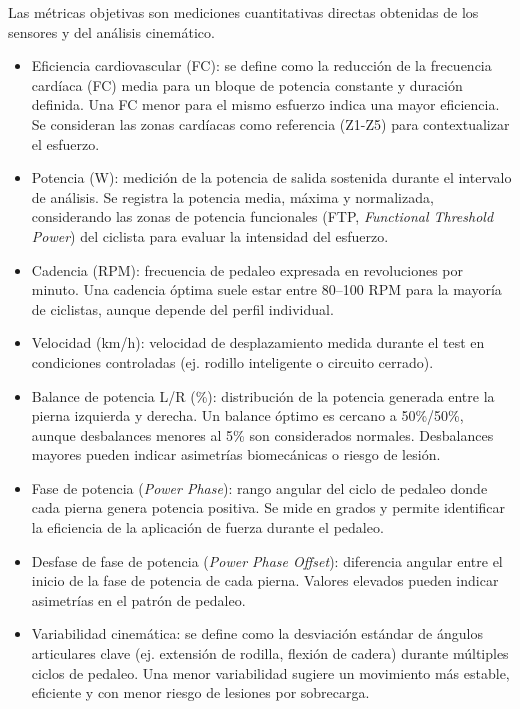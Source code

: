 Las métricas objetivas son mediciones cuantitativas directas obtenidas de los
sensores y del análisis cinemático.

\begin{itemize}
      \item Eficiencia cardiovascular (FC): se define como la reducción de la frecuencia
            cardíaca (FC) media para un bloque de potencia constante y duración definida.
            Una FC menor para el mismo esfuerzo indica una mayor eficiencia. Se consideran
            las zonas cardíacas como referencia (Z1-Z5) para contextualizar el esfuerzo.

      \item Potencia (W): medición de la potencia de salida sostenida durante el intervalo
            de análisis. Se registra la potencia media, máxima y normalizada, considerando
            las zonas de potencia funcionales (FTP, \textit{Functional Threshold Power})
            del ciclista para evaluar la intensidad del esfuerzo.

      \item Cadencia (RPM): frecuencia de pedaleo expresada en revoluciones por minuto. Una
            cadencia óptima suele estar entre 80--100 RPM para la mayoría de ciclistas,
            aunque depende del perfil individual.

      \item Velocidad (km/h): velocidad de desplazamiento medida durante el test en
            condiciones controladas (ej. rodillo inteligente o circuito cerrado).

      \item Balance de potencia L/R (\%): distribución de la potencia generada entre la
            pierna izquierda y derecha. Un balance óptimo es cercano a 50\%/50\%, aunque
            desbalances menores al 5\% son considerados normales. Desbalances mayores
            pueden indicar asimetrías biomecánicas o riesgo de lesión.

      \item Fase de potencia (\textit{Power Phase}): rango angular del ciclo de pedaleo
            donde cada pierna genera potencia positiva. Se mide en grados y permite
            identificar la eficiencia de la aplicación de fuerza durante el pedaleo.

      \item Desfase de fase de potencia (\textit{Power Phase Offset}): diferencia angular
            entre el inicio de la fase de potencia de cada pierna. Valores elevados pueden
            indicar asimetrías en el patrón de pedaleo.

      \item Variabilidad cinemática: se define como la desviación estándar de ángulos
            articulares clave (ej. extensión de rodilla, flexión de cadera) durante
            múltiples ciclos de pedaleo. Una menor variabilidad sugiere un movimiento más
            estable, eficiente y con menor riesgo de lesiones por sobrecarga.
\end{itemize}

